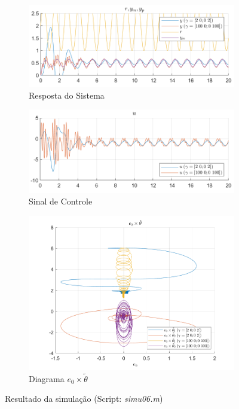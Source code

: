 \documentclass[10pt]{article}
\begin{document}
\begin{figure}[h!]
    \begin{subfigure}[b]{0.45\textwidth}
        \centering
        \includegraphics[width=\textwidth]{img/fig06c.png}
        \caption{Resposta do Sistema}
    \end{subfigure}
    \begin{subfigure}[b]{0.45\textwidth}
        \centering
        \includegraphics[width=\textwidth]{img/fig06e.png}
        \caption{Sinal de Controle}
    \end{subfigure}

    \vspace{0.5cm}

    \begin{subfigure}[b]{0.4\textwidth}
        \centering
        \includegraphics[width=\textwidth]{img/fig06d.png}
        \caption{Diagrama $e_0 \times \tilde{\theta}$}
    \end{subfigure}

    \caption{Resultado da simulação (Script: \textit{simu06.m})}
    \label{fig:sim6}
\end{figure}
\end{document}
